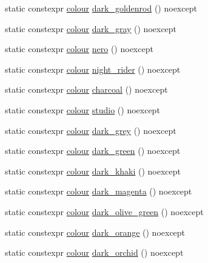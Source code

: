\begin{DoxyCompactItemize}
\item 
static constexpr \mbox{\hyperlink{classmoka_1_1colour}{colour}} \mbox{\hyperlink{classmoka_1_1colour_abcfa7067af326bc6f598efd98bcf45af}{dark\+\_\+goldenrod}} () noexcept
\item 
static constexpr \mbox{\hyperlink{classmoka_1_1colour}{colour}} \mbox{\hyperlink{classmoka_1_1colour_a58c5c69b0ce342644b52c52d72f2ed4e}{dark\+\_\+gray}} () noexcept
\item 
static constexpr \mbox{\hyperlink{classmoka_1_1colour}{colour}} \mbox{\hyperlink{classmoka_1_1colour_ae78de5b8b572127105aeb5b0629b8a19}{nero}} () noexcept
\item 
static constexpr \mbox{\hyperlink{classmoka_1_1colour}{colour}} \mbox{\hyperlink{classmoka_1_1colour_a0eaa40808e68b8be13b5596220feefb7}{night\+\_\+rider}} () noexcept
\item 
static constexpr \mbox{\hyperlink{classmoka_1_1colour}{colour}} \mbox{\hyperlink{classmoka_1_1colour_aab7da28ff616de53d7480c280025a9ce}{charcoal}} () noexcept
\item 
static constexpr \mbox{\hyperlink{classmoka_1_1colour}{colour}} \mbox{\hyperlink{classmoka_1_1colour_ab00385039989ca5e1728e3e4fb10db43}{studio}} () noexcept
\item 
static constexpr \mbox{\hyperlink{classmoka_1_1colour}{colour}} \mbox{\hyperlink{classmoka_1_1colour_a49aa7fd7973c1953755efa5b88031ca5}{dark\+\_\+grey}} () noexcept
\item 
static constexpr \mbox{\hyperlink{classmoka_1_1colour}{colour}} \mbox{\hyperlink{classmoka_1_1colour_abb39a0579f25b25a2884486afcff19bc}{dark\+\_\+green}} () noexcept
\item 
static constexpr \mbox{\hyperlink{classmoka_1_1colour}{colour}} \mbox{\hyperlink{classmoka_1_1colour_a57d7a46d18cbc113703aafd4f2be9c20}{dark\+\_\+khaki}} () noexcept
\item 
static constexpr \mbox{\hyperlink{classmoka_1_1colour}{colour}} \mbox{\hyperlink{classmoka_1_1colour_a473b1241ff0bdf245e529bdc5d03968a}{dark\+\_\+magenta}} () noexcept
\item 
static constexpr \mbox{\hyperlink{classmoka_1_1colour}{colour}} \mbox{\hyperlink{classmoka_1_1colour_a7cfa9a05e5a65672accc670fa4d34d5b}{dark\+\_\+olive\+\_\+green}} () noexcept
\item 
static constexpr \mbox{\hyperlink{classmoka_1_1colour}{colour}} \mbox{\hyperlink{classmoka_1_1colour_a4fa1623f5c554b6869f0d712f0349ac8}{dark\+\_\+orange}} () noexcept
\item 
static constexpr \mbox{\hyperlink{classmoka_1_1colour}{colour}} \mbox{\hyperlink{classmoka_1_1colour_aa53a5fba8189045f620560aade5731d3}{dark\+\_\+orchid}} () noexcept

\end{DoxyCompactItemize}

